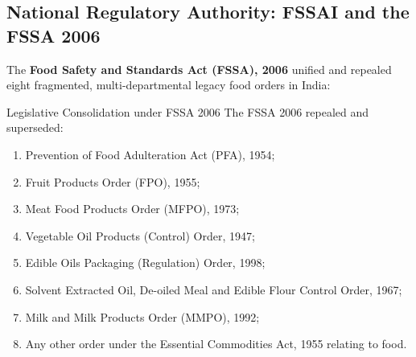 \documentclass[11pt,a4paper,oneside]{article}
\begin{document}
\subsection{National Regulatory Authority: FSSAI and the FSSA 2006}

The \textbf{Food Safety and Standards Act (FSSA), 2006} unified and repealed eight fragmented, multi-departmental legacy food orders in India:

\begin{defbox}{Legislative Consolidation under FSSA 2006}
The FSSA 2006 repealed and superseded:
\begin{enumerate}[label=(\roman*)]
    \item Prevention of Food Adulteration Act (PFA), 1954;
    \item Fruit Products Order (FPO), 1955;
    \item Meat Food Products Order (MFPO), 1973;
    \item Vegetable Oil Products (Control) Order, 1947;
    \item Edible Oils Packaging (Regulation) Order, 1998;
    \item Solvent Extracted Oil, De-oiled Meal and Edible Flour Control Order, 1967;
    \item Milk and Milk Products Order (MMPO), 1992;
    \item Any other order under the Essential Commodities Act, 1955 relating to food.
\end{enumerate}
\end{defbox}
\end{document}
